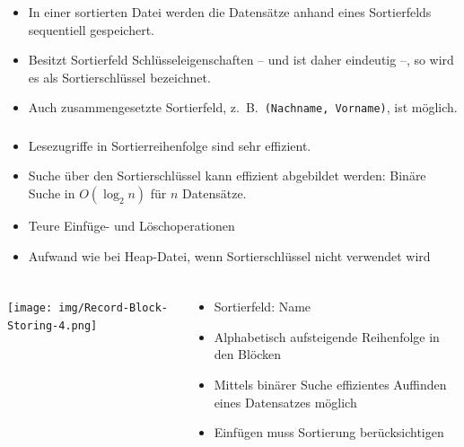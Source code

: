 \begin{frame}
\frametitle{\insertsection}
\framesubtitle{\insertsubsection}
\begin{itemize}
	\item In einer sortierten Datei werden die Datens\"atze anhand eines Sortierfelds sequentiell gespeichert.
	\item Besitzt Sortierfeld Schlüsseleigenschaften -- und ist daher eindeutig --, so wird es als Sortierschl\"ussel bezeichnet.
	\item Auch zusammengesetzte Sortierfeld, z.~B.~\texttt{(Nachname, Vorname)}, ist m\"oglich.
\end{itemize}
\end{frame}

\begin{frame}
	\frametitle{\insertsection}
	\framesubtitle{\insertsubsection}
\abs
	\begin{itemize}
		\item Lesezugriffe in Sortierreihenfolge sind sehr effizient.
		\item Suche über den Sortierschl\"ussel kann effizient abgebildet werden: Binäre Suche in $O(\log_2 n)$ f\"ur $n$ Datens\"atze.
	\end{itemize}
\abs
\pause
	\begin{itemize}
		\item Teure Einf\"uge- und L\"oschoperationen
		\item Aufwand wie bei Heap-Datei, wenn Sortierschl\"ussel nicht verwendet wird
	\end{itemize}
\end{frame}

\begin{frame}
\frametitle{\insertsection}
\framesubtitle{\insertsubsection}
\begin{columns}
	\begin{column}{.4\textwidth}
		\texttt{[image: img/Record-Block-Storing-4.png]}
	\end{column}	
	\begin{column}{.55\textwidth}
		\begin{itemize}
			\item Sortierfeld: Name 
			\item Alphabetisch aufsteigende Reihenfolge in den Bl\"ocken
			\item Mittels bin\"arer Suche effizientes Auffinden eines Datensatzes m\"oglich
			\item Einf\"ugen muss Sortierung ber\"ucksichtigen
		\end{itemize}
	\end{column}
\end{columns}
\end{frame}


